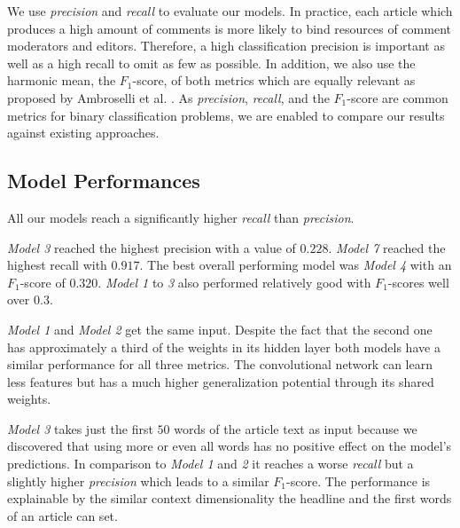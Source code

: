 We use \textit{precision} and \textit{recall} to evaluate our models. 
In practice, each article which produces a high amount of comments is more likely to bind resources of comment moderators and editors. Therefore, a high classification precision is important as well as a high recall to omit as few as possible.
In addition, we also use the harmonic mean, the $F_1$-score, of both metrics which are equally relevant as proposed by Ambroselli et al. \cite{ambroselli2018prediction}.
As \textit{precision}, \textit{recall}, and the $F_1$-score are common metrics for binary classification problems, we are enabled to compare our results against existing approaches.

\subsection{Model Performances}
All our models reach a significantly higher \textit{recall} than \textit{precision}.

\textit{Model 3} reached the highest precision with a value of $0.228$. \textit{Model 7} reached the highest recall with $0.917$. The best overall performing model was \textit{Model 4} with an $F_1$-score of $0.320$. \textit{Model 1} to \textit{3} also performed relatively good with $F_1$-scores well over $0.3$.

\textit{Model 1} and \textit{Model 2} get the same input. Despite the fact that the second one has approximately a third of the weights in its hidden layer both models have a similar performance for all three metrics.
The convolutional network can learn less features but has a much higher generalization potential through its shared weights.

\textit{Model 3} takes just the first $50$ words of the article text as input because we discovered that using more or even all words has no positive effect on the model's predictions. In comparison to \textit{Model 1} and \textit{2} it reaches a worse \textit{recall} but a slightly higher \textit{precision} which leads to a similar $F_1$-score.
The performance is explainable by the similar context dimensionality the headline and the first words of an article can set.

